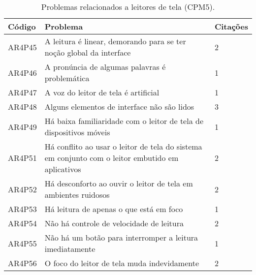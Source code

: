 \begin{table}[htb]
  \begin{center}
    \ABNTEXfontereduzida
    \caption{Problemas relacionados a leitores de tela (CPM5).}
    \label{tab-pro-lei-tel-1}
    \begin{tabular}{p{1.2cm}|p{12.0cm}|p{1.4cm}}
      \textbf{Código} & \textbf{Problema}                                                                                & \textbf{Citações} \\
      \hline
      AR4P45          & A leitura é linear, demorando para se ter noção global da interface                              & 2                 \\
      \hline
      AR4P46          & A pronúncia de algumas palavras é problemática                                                   & 1                 \\
      \hline
      AR4P47          & A voz do leitor de tela é artificial                                                             & 1                 \\
      \hline
      AR4P48          & Alguns elementos de interface não são lidos                                                      & 3                 \\
      \hline
      AR4P49          & Há baixa familiaridade com o leitor de tela de dispositivos móveis                               & 1                 \\
      \hline
      AR4P51          & Há conflito ao usar o leitor de tela do sistema em conjunto com o leitor embutido em aplicativos & 2                 \\
      \hline
      AR4P52          & Há desconforto ao ouvir o leitor de tela em ambientes ruidosos                                   & 2                 \\
      \hline
      AR4P53          & Há leitura de apenas o que está em foco                                                          & 1                 \\
      \hline
      AR4P54          & Não há controle de velocidade de leitura                                                         & 2                 \\
      \hline
      AR4P55          & Não há um botão para interromper a leitura imediatamente                                         & 1                 \\
      \hline
      AR4P56          & O foco do leitor de tela muda indevidamente                                                      & 2                 \\

\end{tabular}
\end{center}
\end{table}
